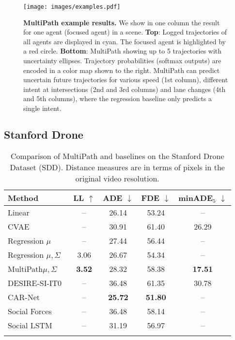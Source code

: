 \documentclass{article}
\newcommand{\multiflow}{MultiPath\xspace}
\begin{document}
\begin{figure}[tp]
  \centering
\texttt{[image: images/examples.pdf]}
\caption{\small \textbf{\multiflow example results.}
We show in one column the result for one agent (focused agent) in a scene.
\textbf{Top}: Logged trajectories of all agents are displayed in cyan. The focused agent is highlighted by a red circle. \textbf{Bottom}: \multiflow showing up to 5 trajectories with uncertainty ellipses. Trajectory probabilities (softmax outputs) are encoded in a color map shown to the right. \multiflow can predict uncertain future trajectories for various speed (1st column), different intent at intersections (2nd and 3rd columns) and lane changes (4th and 5th columns), where the regression baseline only predicts a single intent.
\vspace{-0.4cm}
}
\label{fig:examples}
\end{figure}









\subsection{Stanford Drone}
\label{sec:sdd}

\begin{table}[!tbp]
\caption{\small Comparison of \multiflow and baselines on the Stanford Drone Dataset (SDD). Distance measures are in terms of pixels in the original video resolution.}
\label{tbl:sdd}
\centering
\begin{tabular}{lcccc}
\toprule
Method & LL $\uparrow$ & ADE $\downarrow$  & FDE $\downarrow$ & minADE$_5$ $\downarrow$ \\
\midrule          
Linear                               & --    & 26.14 & 53.24 & --           \\
CVAE                                 & --    & 30.91 & 61.40 & 26.29        \\
Regression $\mu$                     & --    & 27.44 & 56.44 & --           \\
Regression $\mu, \Sigma$             & 3.06  & 26.67 & 54.34 & --           \\
\multiflow $\mu, \Sigma$             & \textbf{3.52} & 28.32 & 58.38 & \textbf{17.51}        \\
\midrule                                 
DESIRE-SI-IT0~\cite{Lee17}           & --    & 36.48 & 61.35 & 30.78        \\
CAR-Net~\cite{Sadeghian18}           & --    & \textbf{25.72} & \textbf{51.80} & --           \\
Social Forces~\cite{Yamaguchi2011}   & --    & 36.48 & 58.14 & --           \\
Social LSTM~\cite{Alahi16}           & --    & 31.19 & 56.97 & --           \\
\bottomrule
\vspace{-0.2cm}
\end{tabular}
\end{table}
\end{document}

